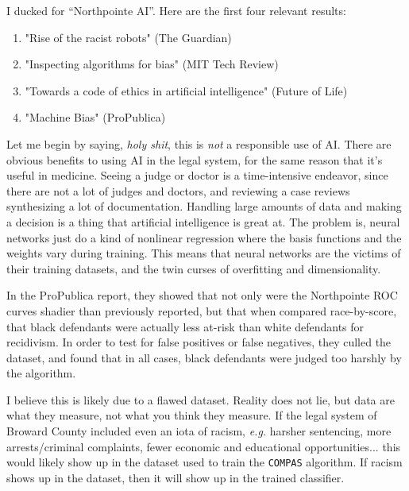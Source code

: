\documentclass[11pt,largemargins, anonymous]{homework}
\begin{document}
\begin{arabicparts}

    \questionpart

I ducked for ``Northpointe AI''. Here are the first four relevant results:

\begin{enumerate}
    \item "Rise of the racist robots" (The Guardian)
    \item "Inspecting algorithms for bias" (MIT Tech Review)
    \item "Towards a code of ethics in artificial intelligence" (Future of Life)
    \item "Machine Bias" (ProPublica)
\end{enumerate}

    Let me begin by saying, \textit{holy shit}, this is \textit{not} a responsible use of AI.
    There are obvious benefits to using AI in the legal system, for the same reason that it's useful in medicine.
    Seeing a judge or doctor is a time-intensive endeavor, since there are not a lot of judges and doctors,
    and reviewing a case reviews synthesizing a lot of documentation.
    Handling large amounts of data and making a decision is a thing that artificial intelligence is great at.
    The problem is, neural networks just do a kind of nonlinear regression
    where the basis functions and the weights vary during training.
    This means that neural networks are the victims of their training datasets,
    and the twin curses of overfitting and dimensionality.

    In the ProPublica report, they showed that not only were the Northpointe ROC curves shadier than previously reported,
    but that when compared race-by-score, that black defendants were actually less at-risk than white defendants for recidivism.
    In order to test for false positives or false negatives, they culled the dataset,
    and found that in all cases, black defendants were judged too harshly by the algorithm.

    I believe this is likely due to a flawed dataset.
    Reality does not lie, but data are what they measure, not what you think they measure.
    If the legal system of Broward County included even an iota of racism, \textit{e.g.}
    harsher sentencing, more arrests/criminal complaints, fewer economic and educational opportunities...
    this would likely show up in the dataset used to train the \texttt{COMPAS} algorithm.
    If racism shows up in the dataset, then it will show up in the trained classifier.


\end{arabicparts}
\end{document}
